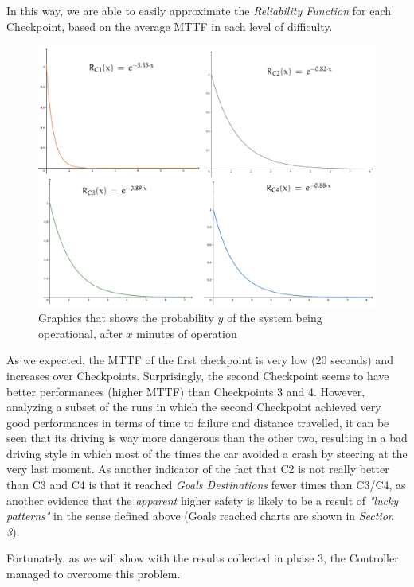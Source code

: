 In this way, we are able to easily approximate the \textsl{Reliability Function} for each Checkpoint, based on the average MTTF in each level of difficulty.

\begin{figure}[h!]
	\includegraphics[width=\textwidth]{img/reliability-comparison.png}
	\caption{Graphics that shows the probability $y$ of the system being operational, after $x$ minutes of operation}
\end{figure}

As we expected, the MTTF of the first checkpoint is very low (20 seconds) and increases over Checkpoints. Surprisingly, the second Checkpoint seems to have better performances (higher MTTF) than Checkpoints 3 and 4. However, analyzing a subset of the runs in which the second Checkpoint achieved very good performances in terms of time to failure and distance travelled, it can be seen that its driving is way more dangerous than the other two, resulting in a bad driving style in which most of the times the car avoided a crash by steering at the very last moment. As another indicator of the fact that C2 is not really better than C3 and C4 is that it reached \textsl{Goals Destinations} fewer times than C3/C4, as another evidence that the \textsl{apparent} higher safety is likely to be a result of \textsl{"lucky patterns"} in the sense defined above (Goals reached charts are shown in \textsl{Section 3}).

Fortunately, as we will show with the results collected in phase 3, the Controller managed to overcome this problem.\newline

